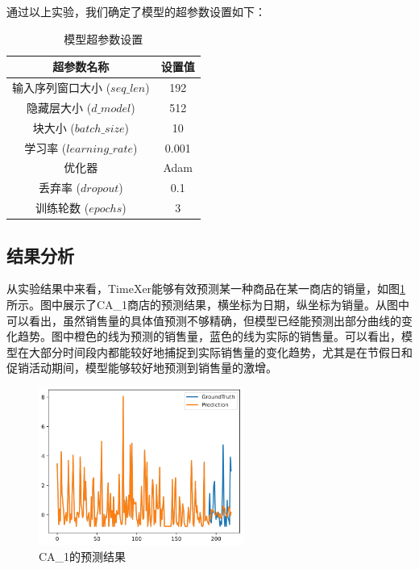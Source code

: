 \documentclass[12pt]{article}
\begin{document}
通过以上实验，我们确定了模型的超参数设置如下：
\begin{table}[H]
    \centering
    \caption{模型超参数设置}
    \label{tab:hyperparameters}
    \begin{tabular}{|c|c|}
        \hline
        \textbf{超参数名称} & \textbf{设置值} \\
        \hline
        输入序列窗口大小 ($seq\_len$) & 192 \\
        \hline
        隐藏层大小 ($d\_model$) & 512 \\
        \hline
        块大小 ($batch\_size$) & 10 \\
        \hline
        学习率 ($learning\_rate$) & 0.001 \\
        \hline
        优化器 & Adam \\
        \hline
        丢弃率 ($dropout$) & 0.1 \\
        \hline
        训练轮数 ($epochs$) & 3 \\
        \hline
    \end{tabular}
\end{table}

\subsection{结果分析}
从实验结果中来看，TimeXer能够有效预测某一种商品在某一商店的销量，如图\ref{fig:CA_1}所示。图中展示了CA\_1商店的预测结果，横坐标为日期，纵坐标为销量。从图中可以看出，虽然销售量的具体值预测不够精确，但模型已经能预测出部分曲线的变化趋势。图中橙色的线为预测的销售量，蓝色的线为实际的销售量。可以看出，模型在大部分时间段内都能较好地捕捉到实际销售量的变化趋势，尤其是在节假日和促销活动期间，模型能够较好地预测到销售量的激增。
\begin{figure}[H]
    \centering
    \includegraphics[width=0.6\textwidth]{image/predict_sample.png}
    \caption{CA\_1的预测结果}
    \label{fig:CA_1}
\end{figure}
\end{document}
